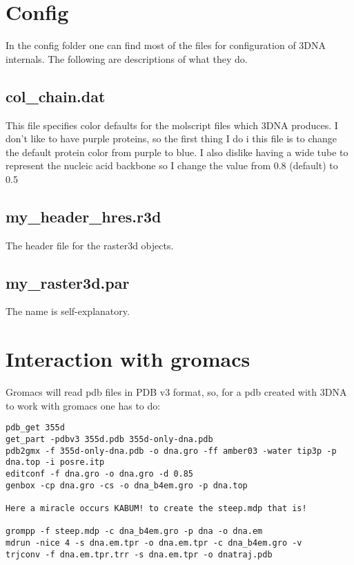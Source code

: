 \documentclass[10pt, oneside, pdftex]{article}
\begin{document}
\section{Config}
In the config folder one can  find most of the files for configuration
of 3DNA internals. The following are descriptions of what they do.

\subsection{col\_chain.dat}
This file specifies color defaults  for the molscript files which 3DNA
produces. I don't  like to have purple proteins, so  the first thing I
do i this  file is to change the default protein  color from purple to
blue. I also dislike having a  wide tube to represent the nucleic acid
backbone so I change the value from 0.8 (default) to 0.5

\subsection{my\_header\_hres.r3d}
The header file for the raster3d objects. 

\subsection{my\_raster3d.par}
The name is self-explanatory.


\section{Interaction with gromacs}
Gromacs will read  pdb files in PDB  v3 format, so, for  a pdb created
with 3DNA to work with gromacs one has to do:

\begin{Verbatim}
pdb_get 355d
get_part -pdbv3 355d.pdb 355d-only-dna.pdb
pdb2gmx -f 355d-only-dna.pdb -o dna.gro -ff amber03 -water tip3p -p dna.top -i posre.itp
editconf -f dna.gro -o dna.gro -d 0.85
genbox -cp dna.gro -cs -o dna_b4em.gro -p dna.top

Here a miracle occurs KABUM! to create the steep.mdp that is!

grompp -f steep.mdp -c dna_b4em.gro -p dna -o dna.em
mdrun -nice 4 -s dna.em.tpr -o dna.em.tpr -c dna_b4em.gro -v
trjconv -f dna.em.tpr.trr -s dna.em.tpr -o dnatraj.pdb 
\end{Verbatim}


\end{document}
